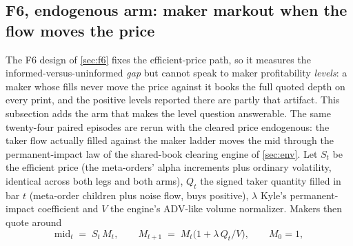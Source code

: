 
\subsection{F6, endogenous arm: maker markout when the flow moves the price}\label{sec:f6-endogenous}

The F6 design of \cref{sec:f6} fixes the efficient-price path, so it measures the informed-versus-uninformed \emph{gap} but cannot speak to maker profitability \emph{levels}: a maker whose fills never move the price against it books the full quoted depth on every print, and the positive levels reported there are partly that artifact. This subsection adds the arm that makes the level question answerable. The same twenty-four paired episodes are rerun with the cleared price endogenous: the taker flow actually filled against the maker ladder moves the mid through the permanent-impact law of the shared-book clearing engine of \cref{sec:env}. Let $S_t$ be the efficient price (the meta-orders' alpha increments plus ordinary volatility, identical across both legs and both arms), $Q_t$ the signed taker quantity filled in bar $t$ (meta-order children plus noise flow, buys positive), $\lambda$ Kyle's permanent-impact coefficient \citep{kyle1985continuous} and $V$ the engine's ADV-like volume normalizer. Makers then quote around
\begin{equation}\label{eq:f6-endo}
\mathrm{mid}_t \;=\; S_t\, M_t,
\qquad
M_{t+1} \;=\; M_t \bigl(1 + \lambda\, Q_t / V\bigr),
\qquad
M_0 = 1,
\end{equation}
